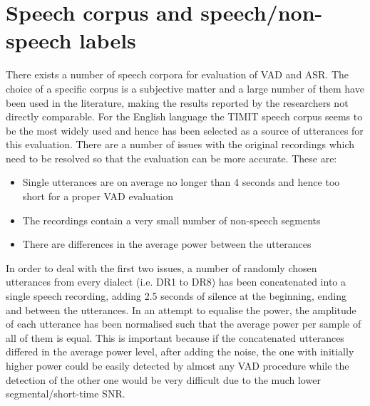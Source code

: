 
\section{Speech corpus and speech/non-speech labels}
\label{sec:speechlabels}

There exists a number of speech corpora for evaluation of VAD and ASR. The choice of a specific corpus is a subjective matter and a large number of them have been used in the literature, making the results reported by the researchers not directly comparable. For the English language the TIMIT speech corpus \cite{TIMIT} seems to be the most widely used and hence has been selected as a source of utterances for this evaluation. There are a number of issues with the original recordings which need to be resolved so that the evaluation can be more accurate. These are:

\begin{itemize}
\item Single utterances are on average no longer than 4 seconds and hence too short for a proper VAD evaluation
\item The recordings contain a very small number of non-speech segments
\item There are differences in the average power between the utterances
\end{itemize}

In order to deal with the first two issues, a number of randomly chosen utterances from every dialect (i.e. DR1 to DR8) has been concatenated into a single speech recording, adding 2.5 seconds of silence at the beginning, ending and between the utterances. In an attempt to equalise the power, the amplitude of each utterance has been normalised such that the average power per sample of all of them is equal. This is important because if the concatenated utterances differed in the average power level, after adding the noise, the one with initially higher power could be easily detected by almost any VAD procedure while the detection of the other one would be very difficult due to the much lower segmental/short-time SNR.

